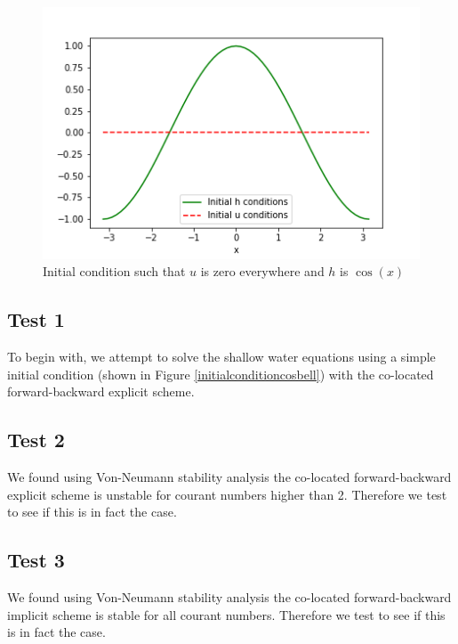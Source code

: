 \documentclass[a4paper,12pt, notitlepage]{article}
\begin{document}
\begin{figure}
\begin{minipage}{.5\textwidth}
	\end{minipage}
	\begin{center}
		\begin{minipage}{.5\textwidth}
			\ContinuedFloat
			\captionsetup{width=0.9\textwidth}
			\captionsetup{justification=centering}
			\includegraphics[width=\textwidth]{initial_condition_cos.png}
			\caption{\label{initialconditioncos}Initial condition such that $u$ is zero everywhere and $h$ is $\cos(x)$}
		\end{minipage}
	\end{center}
\end{figure}

\subsection{Test 1}
To begin with, we attempt to solve the shallow water equations using a simple initial condition (shown in Figure \ref{initialconditioncosbell}) with the co-located forward-backward explicit scheme.

\subsection{Test 2}
We found using Von-Neumann stability analysis the co-located forward-backward explicit scheme is unstable for courant numbers higher than 2. Therefore we test to see if this is in fact the case.

\subsection{Test 3}
We found using Von-Neumann stability analysis the co-located forward-backward implicit scheme is stable for all courant numbers. Therefore we test to see if this is in fact the case.
\end{document}
